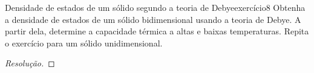 \begin{exercício}{Densidade de estados de um sólido segundo a teoria de Debye}{exercício8}
    Obtenha a densidade de estados de um sólido bidimensional usando a teoria de Debye. A partir dela, determine a capacidade térmica a altas e baixas temperaturas. Repita o exercício para um sólido unidimensional.
\end{exercício}
\begin{proof}[Resolução]

\end{proof}
